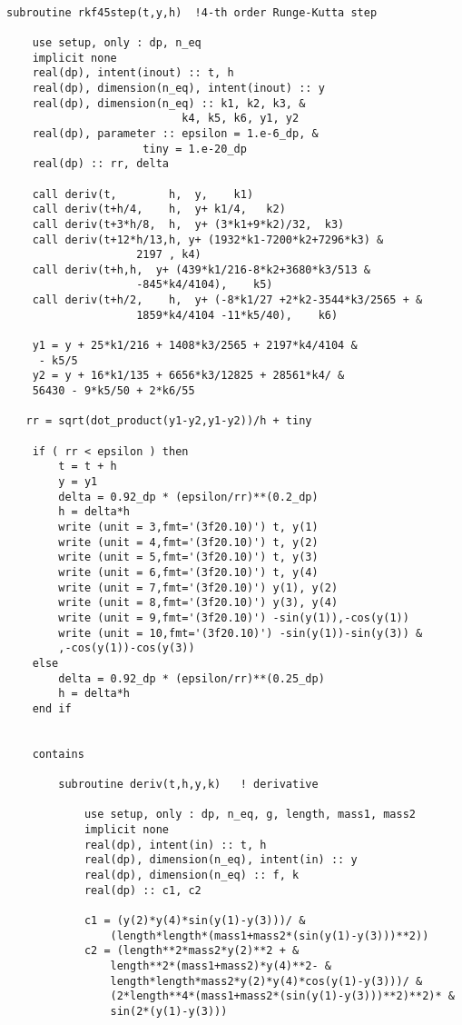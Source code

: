 \documentclass[12pt]{article}
\begin{document}
\begin{lstlisting}[frame=single,caption={ {\tt rkf45.f95}},label=module]

subroutine rkf45step(t,y,h)  !4-th order Runge-Kutta step
	
	use setup, only : dp, n_eq
	implicit none
	real(dp), intent(inout) :: t, h
	real(dp), dimension(n_eq), intent(inout) :: y 
	real(dp), dimension(n_eq) :: k1, k2, k3, &
						   k4, k5, k6, y1, y2
	real(dp), parameter :: epsilon = 1.e-6_dp, &
					 tiny = 1.e-20_dp
	real(dp) :: rr, delta
		
	call deriv(t,	     h,	 y,	   k1)
	call deriv(t+h/4,	 h,  y+ k1/4,   k2)
	call deriv(t+3*h/8,	 h,  y+ (3*k1+9*k2)/32,  k3)
	call deriv(t+12*h/13,h, y+ (1932*k1-7200*k2+7296*k3) &
					2197 , k4)	
	call deriv(t+h,h,  y+ (439*k1/216-8*k2+3680*k3/513 &
					-845*k4/4104),	  k5)	
	call deriv(t+h/2,	 h,  y+ (-8*k1/27 +2*k2-3544*k3/2565 + &
					1859*k4/4104 -11*k5/40),	k6)
	
    y1 = y + 25*k1/216 + 1408*k3/2565 + 2197*k4/4104 &
     - k5/5
    y2 = y + 16*k1/135 + 6656*k3/12825 + 28561*k4/ & 
    56430 - 9*k5/50 + 2*k6/55
    
   rr = sqrt(dot_product(y1-y2,y1-y2))/h + tiny
    
    if ( rr < epsilon ) then
        t = t + h
        y = y1
        delta = 0.92_dp * (epsilon/rr)**(0.2_dp)
        h = delta*h
        write (unit = 3,fmt='(3f20.10)') t, y(1)
        write (unit = 4,fmt='(3f20.10)') t, y(2)
        write (unit = 5,fmt='(3f20.10)') t, y(3)
        write (unit = 6,fmt='(3f20.10)') t, y(4)
        write (unit = 7,fmt='(3f20.10)') y(1), y(2)
        write (unit = 8,fmt='(3f20.10)') y(3), y(4)
        write (unit = 9,fmt='(3f20.10)') -sin(y(1)),-cos(y(1))
        write (unit = 10,fmt='(3f20.10)') -sin(y(1))-sin(y(3)) &
        ,-cos(y(1))-cos(y(3))
    else
        delta = 0.92_dp * (epsilon/rr)**(0.25_dp)
        h = delta*h
    end if
	
    	
    contains
    
        subroutine deriv(t,h,y,k)   ! derivative

	        use setup, only : dp, n_eq, g, length, mass1, mass2
	        implicit none
	        real(dp), intent(in) :: t, h
	        real(dp), dimension(n_eq), intent(in) :: y
	        real(dp), dimension(n_eq) :: f, k
	        real(dp) :: c1, c2

	        c1 = (y(2)*y(4)*sin(y(1)-y(3)))/ &
	        	(length*length*(mass1+mass2*(sin(y(1)-y(3)))**2))
	        c2 = (length**2*mass2*y(2)**2 + &
				length**2*(mass1+mass2)*y(4)**2- &
				length*length*mass2*y(2)*y(4)*cos(y(1)-y(3)))/ &
				(2*length**4*(mass1+mass2*(sin(y(1)-y(3)))**2)**2)* &
				sin(2*(y(1)-y(3)))


\end{lstlisting}
\end{document}
